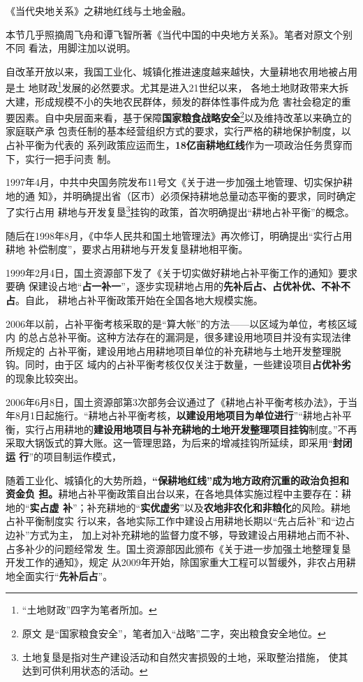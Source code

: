 《当代央地关系》之耕地红线与土地金融。

本节几乎照摘周飞舟和谭飞智所著《当代中国的中央地方关系》。笔者对原文个别不同
看法，用脚注加以说明。

自改革开放以来，我国工业化、城镇化推进速度越来越快，大量耕地农用地被占用是土
地财政\footnote{“土地财政”四字为笔者所加。}发展的必然要求。尤其是进入21世纪以来，
各地土地财政带来大拆大建，形成规模不小的失地农民群体，频发的群体性事件成为危
害社会稳定的重要因素。自中央层面来看，基于保障\textbf{国家粮食战略安全}\footnote{原文
  是“国家粮食安全”，笔者加入“战略”二字，突出粮食安全地位。}以及维持改革以来确立的家庭联产承
包责任制的基本经营组织方式的要求，实行严格的耕地保护制度，以占补平衡为代表的
系列政策应运而生，\textbf{18亿亩耕地红线}作为一项政治任务贯穿而下，实行一把手问责
制。

1997年4月，中共中央国务院发布11号文《关于进一步加强土地管理、切实保护耕地的通
知》，并明确提出省（区市）必须保持耕地总量动态平衡的要求，同时确定了实行占用
耕地与开发复垦\footnote{土地复垦是指对生产建设活动和自然灾害损毁的土地，采取整治措施，
  使其达到可供利用状态的活动。}挂钩的政策，首次明确提出“耕地占补平衡”的概念。

随后在1998年8月，《中华人民共和国土地管理法》再次修订，明确提出“实行占用耕地
补偿制度”，要求占用耕地与开发复垦耕地相平衡。

1999年2月4日，国土资源部下发了《关于切实做好耕地占补平衡工作的通知》要求要确
保建设占地“\textbf{占一补一}”，逐步实现耕地占用的\textbf{先补后占、占优补优、不补不占}。自此，
耕地占补平衡政策开始在全国各地大规模实施。

2006年以前，占补平衡考核采取的是“算大帐”的方法——以区域为单位，考核区域内
的总占总补平衡。这种方法存在的漏洞是，很多建设用地项目并没有实现法律所规定的
占补平衡，建设用地占用耕地项目单位的补充耕地与土地开发整理脱钩。同时，由于区
域内的占补平衡考核仅仅关注于数量，一些建设项目\textbf{占优补劣}的现象比较突出。

2006年6月8日，国土资源部第3次部务会议通过了《耕地占补平衡考核办法》，于当
年8月1日起施行。“耕地占补平衡考核，\textbf{以建设用地项目为单位进行}”“耕地占补平
衡，实行占用耕地的\textbf{建设用地项目与补充耕地的土地开发整理项目挂钩}制度。”不再
采取大锅饭式的算大账。这一管理思路，为后来的增减挂钩所延续，即采用“\textbf{封闭运
  行}”的项目制运作模式，

随着工业化、城镇化的大势所趋，\textbf{“保耕地红线”成为地方政府沉重的政治负担和资金负
担。}耕地占补平衡政策自出台以来，在各地具体实施过程中主要存在：耕地的“\textbf{实占虚
补}”；补充耕地的“\textbf{实优虚劣}”以及\textbf{农地非农化和非粮化}的风险。耕地占补平衡制度实
行以来，各地实际工作中建设占用耕地长期以“先占后补”和“边占边补”方式为主，
加上对补充耕地的监督力度不够，导致建设占用耕地占而不补、占多补少的问题经常发
生。国土资源部因此颁布《关于进一步加强土地整理复垦开发工作的通知》，规定
从2009年开始，除国家重大工程可以暂缓外，非农占用耕地全面实行“\textbf{先补后占}”。


